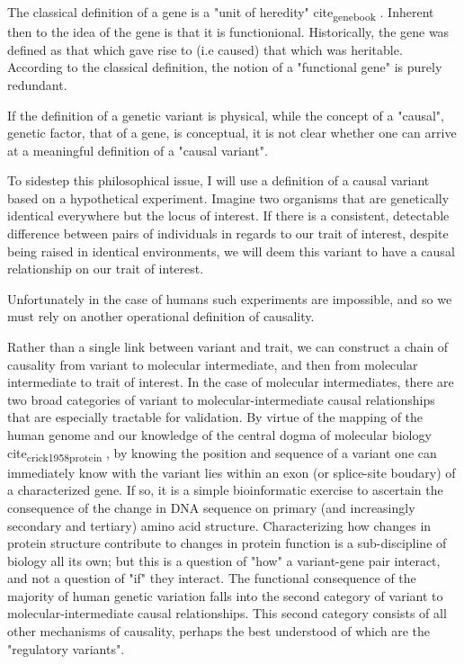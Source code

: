 The classical definition of a gene is a "unit of heredity" cite\textsubscript{gene}\textsubscript{book} .  Inherent then to the idea of the gene is that it is functionional.  Historically,
the gene was defined as that which gave rise to (i.e caused) that which was heritable.
According to the classical definition, the notion of a "functional gene" is purely redundant.  

If the definition of a genetic variant is physical, while the concept of a "causal", genetic factor, that of a gene, is conceptual, 
it is not clear whether one can arrive at a meaningful definition of a "causal variant".  

To sidestep this philosophical issue, I will use a definition of a causal variant based on a hypothetical experiment.  Imagine two organisms that are
genetically identical everywhere but the locus of interest.  If there is a consistent, detectable difference between pairs of individuals in regards to our trait
 of interest, despite being raised in identical environments, we will deem this variant to have a causal relationship on our trait of interest.

Unfortunately in the case of humans such experiments are impossible, and so we must rely on another operational definition of causality.

Rather than a single link between variant and trait, we can construct a chain of causality from variant to molecular intermediate, and then from molecular intermediate to trait
of interest.  In the case of molecular intermediates, there are two broad categories of variant to molecular-intermediate causal relationships that are especially tractable for 
validation.  By virtue of the mapping of the human genome and our knowledge of the central dogma of molecular biology cite\textsubscript{crick1958protein} , by knowing the position and sequence
of a variant one can immediately know with the variant lies within an exon (or splice-site boudary) of a characterized gene.  If so, it is a simple bioinformatic exercise to 
ascertain the consequence of the change in DNA sequence on primary (and increasingly secondary and tertiary) amino acid structure.  Characterizing how changes in protein
structure contribute to changes in protein function is a sub-discipline of biology all its own; but this is a question of "how" a variant-gene pair interact, and not a question of 
"if" they interact.  The functional consequence of the majority of human genetic variation falls into the second category of variant to molecular-intermediate causal relationships.  
This second category consists of all other mechanisms of causality, perhaps the best understood of which are the "regulatory variants". 



